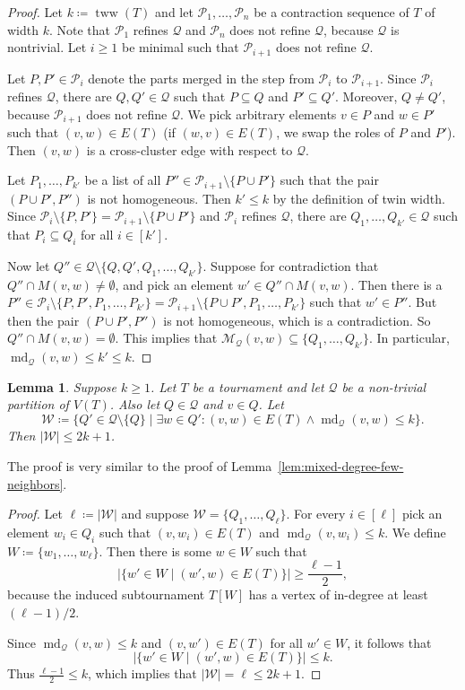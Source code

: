 \PassOptionsToPackage{dvipsnames,svgnames}{xcolor}\documentclass[10pt,a4paper]{article}
\newtheorem{lemma}{Lemma}[section]
\newcommand{\CM}{{\mathcal M}}
\newcommand{\CP}{{\mathcal P}}
\newcommand{\CQ}{{\mathcal Q}}
\newcommand{\CW}{{\mathcal W}}
\DeclareMathOperator{\md}{md}
\DeclareMathOperator{\tww}{tww}
\begin{document}
\begin{proof}
 Let $k \coloneqq \tww(T)$ and let $\CP_1,\dots,\CP_n$ be a contraction sequence of $T$ of width $k$.
 Note that $\CP_1$ refines $\CQ$ and $\CP_n$ does not refine $\CQ$, because $\CQ$ is nontrivial.
 Let $i \geq 1$ be minimal such that $\CP_{i+1}$ does not refine $\CQ$.

 Let $P,P' \in\CP_i$ denote the parts merged in the step from $\CP_i$ to $\CP_{i+1}$.
 Since $\CP_i$ refines $\CQ$, there are $Q,Q' \in \CQ$ such that $P \subseteq Q$ and $P'\subseteq Q'$.
 Moreover, $Q \neq Q'$, because $\CP_{i+1}$ does not refine $\CQ$.
 We pick arbitrary elements $v \in P$ and $w \in P'$ such that $(v,w) \in E(T)$ (if $(w,v)\in E(T)$, we swap the roles of $P$ and $P'$).
 Then $(v,w)$ is a cross-cluster edge with respect to $\CQ$.

 Let $P_1,\dots,P_{k'}$ be a list of all $P'' \in \CP_{i+1} \setminus \{P\cup P'\}$ such that the pair $(P\cup P',P'')$ is not homogeneous.
 Then $k' \leq k$ by the definition of twin width.
 Since $\CP_i \setminus \{P,P'\} = \CP_{i+1} \setminus \{P\cup P'\}$ and $\CP_i$ refines $\CQ$, there are $Q_1,\dots,Q_{k'} \in \CQ$ such that $P_i \subseteq Q_i$ for all $i \in [k']$.

 Now let $Q'' \in \CQ \setminus \{Q,Q',Q_1,\dots,Q_{k'}\}$.
 Suppose for contradiction that $Q'' \cap M(v,w) \neq \emptyset$, and pick an element $w' \in Q'' \cap M(v,w)$.
 Then there is a $P'' \in \CP_i \setminus \{P,P',P_1,\dots,P_{k'}\} = \CP_{i+1} \setminus \{P\cup P',P_1,\dots,P_{k'}\}$ such that $w' \in P''$.
 But then the pair $(P\cup P',P'')$ is not homogeneous, which is a contradiction.
 So $Q'' \cap M(v,w) = \emptyset$.
 This implies that $\CM_\CQ(v,w) \subseteq \{Q_1,\dots,Q_{k'}\}$.
 In particular, $\md_\CQ(v,w) \leq k' \leq k$.
\end{proof}

\begin{lemma}
 \label{lem:mixed-degree-few-neighbors-partition}
 Suppose $k \geq 1$.
 Let $T$ be a tournament and let $\CQ$ be a non-trivial partition of $V(T)$.
 Also let $Q \in \CQ$ and $v \in Q$.
 Let
 \[\CW \coloneqq \{Q' \in \CQ \setminus \{Q\} \mid \exists w \in Q'\colon (v,w) \in E(T) \wedge \md_\CQ(v,w) \leq k\}.\]
 Then $|\CW| \leq 2k + 1$.
\end{lemma}

The proof is very similar to the proof of Lemma~\ref{lem:mixed-degree-few-neighbors}.

\begin{proof}
 Let $\ell \coloneqq |\CW|$ and suppose $\CW=\{Q_1,\dots,Q_\ell\}$.
 For every $i \in [\ell]$ pick an element $w_i \in Q_i$ such that $(v,w_i) \in E(T)$ and $\md_\CQ(v,w_i) \leq k$.
 We define $W \coloneqq \{w_1,\dots,w_\ell\}$.
 Then there is some $w \in W$ such that
 \[|\{w' \in W \mid (w',w) \in E(T)\}| \geq \frac{\ell - 1}{2},\]
 because the induced subtournament $T[W]$ has a vertex of in-degree at least $(\ell-1)/2$.

 Since $\md_\CQ(v,w) \leq k$ and $(v,w') \in E(T)$ for all $w' \in W$, it follows that
 \[|\{w' \in W \mid (w',w) \in E(T)\}| \leq k.\]
 Thus $\frac{\ell - 1}{2} \leq k$, which implies that $|\CW| = \ell \leq 2k + 1$.
\end{proof}
\end{document}
